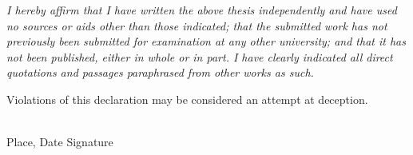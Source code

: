 \clearpage
\vspace*{3cm}

\noindent\textit{I hereby affirm that I have written the above thesis independently and have used no sources or aids other than those indicated; that the submitted work has not previously been submitted for examination at any other university; and that it has not been published, either in whole or in part. I have clearly indicated all direct quotations and passages paraphrased from other works as such.}

\vspace{1cm}
\noindent Violations of this declaration may be considered an attempt at deception.

\vspace{3cm}
\noindent\makebox[6cm]{\hrulefill} \hfill \makebox[6cm]{\hrulefill}\\
\noindent Place, Date \hfill Signature
